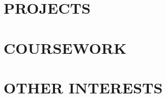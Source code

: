 \documentclass[margin, 11pt]{res} %
\begin{document}
\begin{resume}
\section{PROJECTS}


\section{COURSEWORK}

\section{OTHER INTERESTS}


\end{resume}
\end{document}
